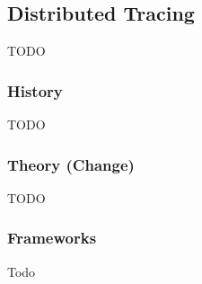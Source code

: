 


\subsection{Distributed Tracing}
TODO
\subsubsection{History}
TODO
\subsubsection{Theory (Change)}
TODO
\subsubsection{Frameworks}
Todo

